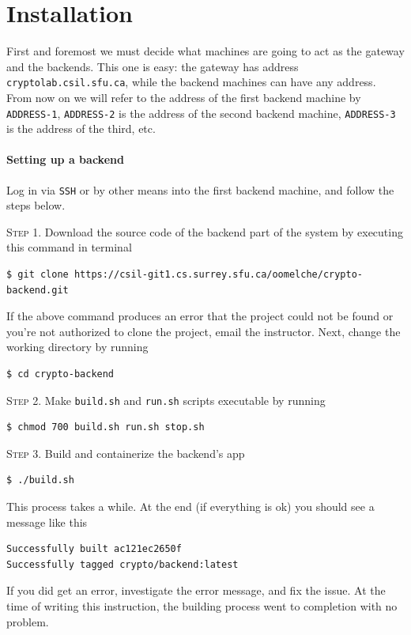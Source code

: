 \documentclass{article}
\begin{document}
\section{Installation}
\vspace{0.25cm}

First and foremost we must decide what machines are going to act as the gateway and the backends. This one is easy: the gateway has address \texttt{cryptolab.csil.sfu.ca}, while the backend machines can have any address. From now on we will refer to the address of the first backend machine by \texttt{ADDRESS-1}, \texttt{ADDRESS-2} is the address of the second backend machine, \texttt{ADDRESS-3} is the address of the third, etc.   

\vspace{1cm}

\paragraph{Setting up a backend} Log in via \texttt{SSH} or by other means into the first backend machine, and follow the steps below.

\vspace{0.25cm}

\textsc{Step 1}. Download the source code of the backend part of the system by executing this command in terminal
\begin{lstlisting}
$ git clone https://csil-git1.cs.surrey.sfu.ca/oomelche/crypto-backend.git
\end{lstlisting}
If the above command produces an error that the project could not be found or you're not authorized to clone the project, email the instructor. Next, change the working directory by running
\begin{lstlisting}
$ cd crypto-backend
\end{lstlisting}

\vspace{0.5cm}

\textsc{Step 2}. Make \texttt{build.sh} and \texttt{run.sh} scripts executable by running 
\begin{lstlisting}
$ chmod 700 build.sh run.sh stop.sh
\end{lstlisting}

\vspace{0.5cm}

\textsc{Step 3}. Build and containerize the backend's app
\begin{lstlisting}
$ ./build.sh
\end{lstlisting}
This process takes a while. At the end (if everything is ok) you should see a message like this
\begin{lstlisting}
Successfully built ac121ec2650f
Successfully tagged crypto/backend:latest
\end{lstlisting}
If you did get an error, investigate the error message, and fix the issue. At the time of writing this instruction, the building process went to completion with no problem.
\end{document}
